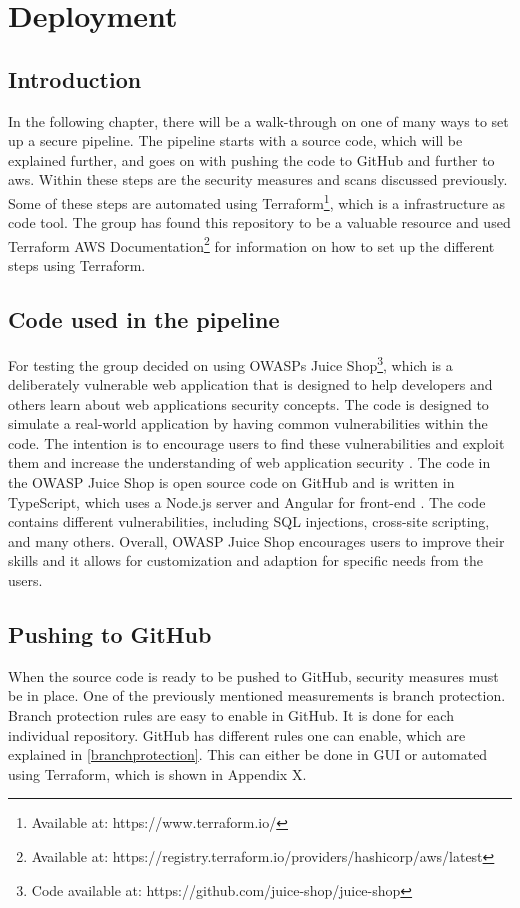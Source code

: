 \chapter{Deployment}
\label{Deployment}
\section{Introduction}
In the following chapter, there will be a walk-through on one of many ways to set up a secure pipeline. The pipeline starts with a source code, which will be explained further, and goes on with pushing the code to GitHub and further to \acrshort{aws}. Within these steps are the security measures and scans discussed previously. Some of these steps are automated using Terraform\footnote{Available at: https://www.terraform.io/}, which is a \gls{infrastructure as code} tool. The group has found this repository to be a valuable resource \cite{aws-cicd-pipeline} and used Terraform AWS Documentation\footnote{Available at: https://registry.terraform.io/providers/hashicorp/aws/latest} for information on how to set up the different steps using Terraform. 

\section{Code used in the pipeline}
For testing the group decided on using OWASPs Juice Shop\footnote{Code available at: https://github.com/juice-shop/juice-shop}, which is a deliberately vulnerable web application that is designed to help developers and others learn about web applications security concepts. The code is designed to simulate a real-world application by having common vulnerabilities within the code. The intention is to encourage users to find these vulnerabilities and exploit them and increase the understanding of web application security \cite{owaspJuiceShop}.
The code in the OWASP Juice Shop is open source code on GitHub and is written in TypeScript, which uses a Node.js server and Angular for \gls{front-end} \cite{owaspJuiceShopCode}.
The code contains different vulnerabilities, including SQL injections, cross-site scripting, and many others. 
Overall, OWASP Juice Shop encourages users to improve their skills and it allows for customization and adaption for specific needs from the users. 

\section{Pushing to GitHub}
When the source code is ready to be pushed to GitHub, security measures must be in place. One of the previously mentioned measurements is branch protection. Branch protection rules are easy to enable in GitHub. It is done for each individual repository. GitHub has different rules one can enable, which are explained in \ref{branchprotection}. This can either be done in \gls{GUI} or automated using Terraform, which is shown in Appendix X. 

